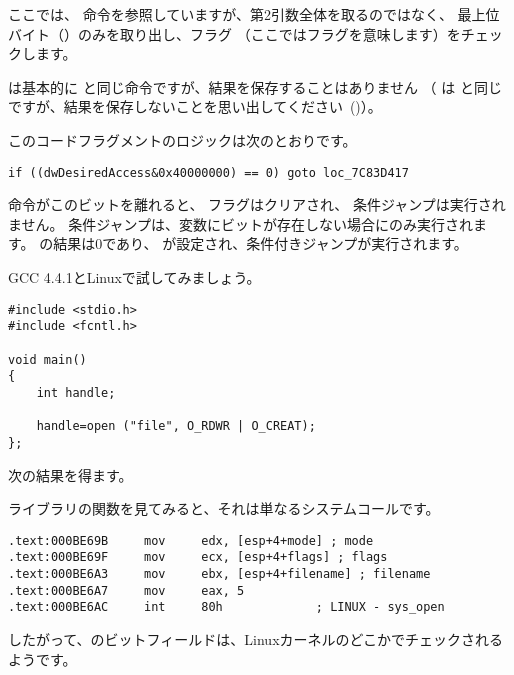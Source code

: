 ここでは、 \TEST 命令を参照していますが、第2引数全体を取るのではなく、
最上位バイト（）のみを取り出し、フラグ
（ここではフラグを意味します）をチェックします。

\TEST は基本的に \AND と同じ命令ですが、結果を保存することはありません
（ \CMP は \SUB と同じですが、結果を保存しないことを思い出してください~()）。

このコードフラグメントのロジックは次のとおりです。

\begin{lstlisting}[style=customc]
if ((dwDesiredAccess&0x40000000) == 0) goto loc_7C83D417
\end{lstlisting}


\AND 命令がこのビットを離れると、 \ZF フラグはクリアされ、
\JZ 条件ジャンプは実行されません。 
条件ジャンプは、変数にビットが存在しない場合にのみ実行されます。 
\AND の結果は0であり、 \ZF が設定され、条件付きジャンプが実行されます。

GCC 4.4.1とLinuxで試してみましょう。

\begin{lstlisting}[style=customc]
#include <stdio.h>
#include <fcntl.h>

void main()
{
	int handle;

	handle=open ("file", O_RDWR | O_CREAT);
};
\end{lstlisting}

次の結果を得ます。




ライブラリの関数を見てみると、それは単なるシステムコールです。

\begin{lstlisting}[caption=open() (libc.so.6),style=customasmx86]
.text:000BE69B     mov     edx, [esp+4+mode] ; mode
.text:000BE69F     mov     ecx, [esp+4+flags] ; flags
.text:000BE6A3     mov     ebx, [esp+4+filename] ; filename
.text:000BE6A7     mov     eax, 5
.text:000BE6AC     int     80h             ; LINUX - sys_open
\end{lstlisting}


したがって、のビットフィールドは、Linuxカーネルのどこかでチェックされるようです。

